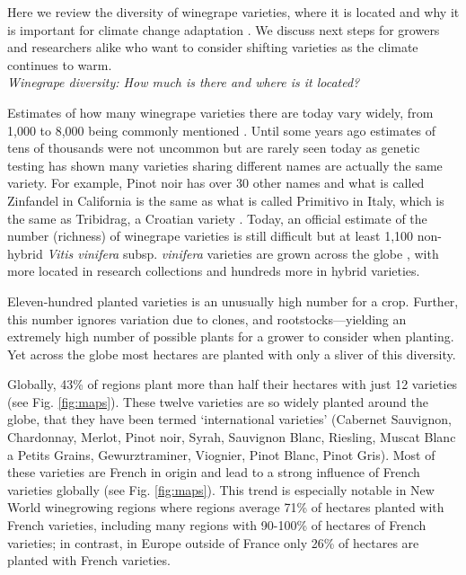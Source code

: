 \documentclass[11pt,letterpaper]{article}
\begin{document}
Here we review the diversity of winegrape varieties, where it is located and why it is important for climate change adaptation \citep{Wolkovich2017}. We discuss next steps for growers and researchers alike who want to consider shifting varieties as the climate continues to warm. \\

\emph{Winegrape diversity: How much is there and where is it located?}

Estimates of how many winegrape varieties there are today vary widely, from 1,000 to 8,000 being commonly mentioned \citep{Bouquet2002,galet2015}. Until some years ago estimates of tens of thousands were not uncommon but are rarely seen today as genetic testing has shown many varieties sharing different names are actually the same variety. For example, Pinot noir has over 30 other names \citep{winegrapesbook} and what is called Zinfandel in California is the same as what is called Primitivo in Italy, which is the same as Tribidrag, a Croatian variety \citep{winegrapesbook}. Today, an official estimate of the number (richness) of winegrape varieties is still difficult but at least 1,100 non-hybrid \emph{Vitis vinifera} subsp. \emph{vinifera} varieties are grown across the globe \citep{varbook}, with more located in research collections and hundreds more in hybrid varieties. 

Eleven-hundred planted varieties is an unusually high number for a crop. Further, this number ignores variation due to clones, and rootstocks---yielding an extremely high number of possible plants for a grower to consider when planting. Yet across the globe most hectares are planted with only a sliver of this diversity.  

Globally, 43\% of regions plant more than half their hectares with just 12 varieties (see Fig. \ref{fig:maps}). These twelve varieties are so widely planted around the globe, that they have been termed `international varieties' (Cabernet Sauvignon, Chardonnay, Merlot,  Pinot noir, Syrah, Sauvignon Blanc, Riesling, Muscat Blanc a Petits Grains, Gewurztraminer, Viognier, Pinot Blanc, Pinot Gris). Most of these varieties are French in origin and lead to a strong influence of French varieties globally (see Fig. \ref{fig:maps}). This trend is especially notable in New World winegrowing regions where regions average 71\% of hectares planted with French varieties, including many regions with 90-100\% of hectares of French varieties; in contrast, in Europe outside of France only 26\% of hectares are planted with French varieties. 
\end{document}
